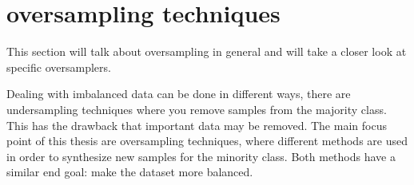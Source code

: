 \section{oversampling techniques}
This section will talk about oversampling in general and will take a closer look at specific oversamplers.

Dealing with imbalanced data can be done in different ways, there are undersampling techniques where you remove samples from the majority class. This has the drawback that important data may be removed. The main focus point of this thesis are oversampling techniques, where different methods are used in order to synthesize new samples for the minority class. Both methods have a similar end goal: make the dataset more balanced.